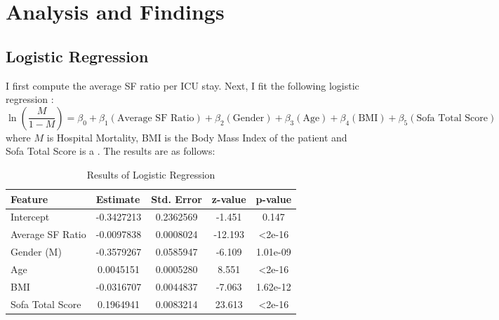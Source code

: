 
\chapter{Analysis and Findings} %

\label{Chapter3} %


\section{Logistic Regression}

I first compute the average SF ratio per ICU stay.  Next, I fit the following logistic regression :
\setlength\abovedisplayskip{4pt}
\setlength\belowdisplayskip{4pt}
\begin{equation*}
\ln \left(\frac{M}{1-M}\right)=\beta_{0}+\beta_{1} (\text{Average SF Ratio})+\beta_{2} (\text{Gender}) + \beta_{3} (\text{Age}) + \beta_{4} (\text{BMI}) + \beta_{5} (\text{Sofa Total Score}) 
\end{equation*}
where $M$ is Hospital Mortality, BMI is the Body Mass Index of the patient and Sofa Total Score is a  .  The results are as follows:

\begin{table}[H] 
\centering
\begin{tabular}{|l|c|c|c|c|}
\hline
\textbf{Feature} & \multicolumn{1}{l|}{\textbf{Estimate}} & \multicolumn{1}{l|}{\textbf{Std. Error}} & \multicolumn{1}{l|}{\textbf{z-value}} & \multicolumn{1}{l|}{\textbf{p-value}} \\ \hline
Intercept & -0.3427213 & 0.2362569 & -1.451 & 0.147 \\ \hline
Average SF Ratio & -0.0097838 & 0.0008024 & -12.193 & \textless 2e-16 \\ \hline
Gender (M) & -0.3579267 & 0.0585947 & -6.109 & 1.01e-09 \\ \hline
Age & 0.0045151 & 0.0005280 & 8.551 & \textless 2e-16 \\ \hline
BMI & -0.0316707 & 0.0044837 & -7.063 & 1.62e-12 \\ \hline
Sofa Total Score & 0.1964941 & 0.0083214 & 23.613 & \textless 2e-16 \\ \hline
\end{tabular}
\caption{Results of Logistic Regression}
\label{tab:logisitic}
\end{table}

